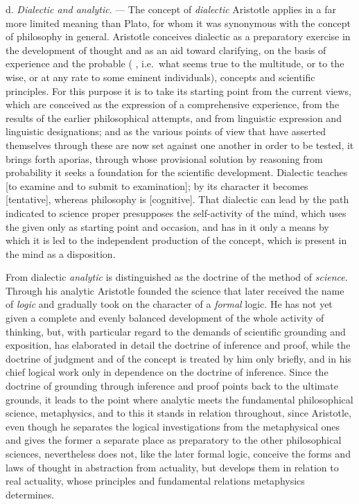 \divrule

d. \emph{Dialectic and analytic}. --- The concept of \emph{dialectic}
Aristotle applies in a far more limited meaning than Plato, for whom it
was synonymous with the concept of philosophy in general. Aristotle
conceives dialectic as a preparatory exercise in the development of
thought and as an aid toward clarifying, on the basis of experience and
the probable ( , i.e.\ what seems true to the
multitude, or to the wise, or at any rate to some eminent individuals),
concepts and scientific principles. For this purpose it is to take its
starting point from the current views, which are conceived as the
expression of a comprehensive experience, from the results of the
earlier philosophical attempts, and from linguistic expression and
linguistic designations; and as the various points of view that have
asserted themselves through these are now set against one another in
order to be tested, it brings forth aporias, through whose provisional
solution by reasoning from probability it seeks a foundation for the
scientific development. Dialectic teaches  [to examine and to submit to examination]; by its character it
becomes  [tentative], whereas philosophy is
 [cognitive]. That dialectic can lead by the path
indicated to science proper presupposes the self-activity of the mind,
which uses the given only as starting point and occasion, and has in it
only a means by which it is led to the independent production of the
concept, which is present in the mind as a disposition.

From dialectic \emph{analytic} is distinguished as the doctrine of the
method of \emph{science}. Through his analytic Aristotle founded the
science that later received the name of \emph{logic} and gradually took
on the character of a \emph{formal} logic. He has not yet given a
complete and evenly balanced development of the whole activity of
thinking, but, with particular regard to the demands of
scientific grounding and exposition, has elaborated in detail the
doctrine of inference and proof, while the doctrine of judgment and of
the concept is treated by him only briefly, and in his chief logical
work only in dependence on the doctrine of inference. Since the
doctrine of grounding through inference and proof points back to the
ultimate grounds, it leads to the point where analytic meets the
fundamental philosophical science, metaphysics, and to this it stands
in relation throughout, since Aristotle, even though he separates the
logical investigations from the metaphysical ones and gives the former
a separate place as preparatory to the other philosophical sciences,
nevertheless does not, like the later formal logic, conceive the forms
and laws of thought in abstraction from actuality, but develops them in
relation to real actuality, whose principles and fundamental relations
metaphysics determines.

